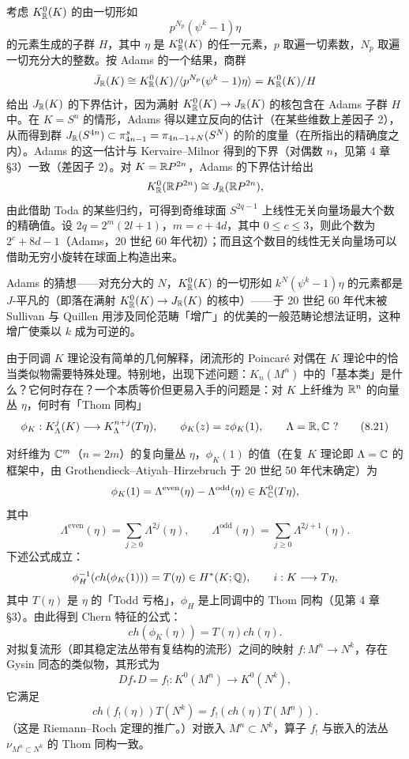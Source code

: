 考虑 $K_{\mathbb{R}}^0(K)$ 的由一切形如
\begin{equation}
p^{N_p}(\psi^k-1)\eta \tag{8.20}
\end{equation}
的元素生成的子群 $H$，其中 $\eta$ 是 $K_{\mathbb{R}}^0(K)$ 的任一元素，$p$ 取遍一切素数，$N_p$ 取遍一切充分大的整数。按 Adams 的一个结果，商群
\[
\bar J_{\mathbb{R}}(K)\cong K_{\mathbb{R}}^0(K)/\langle p^{N_p}(\psi^k-1)\eta\rangle=K_{\mathbb{R}}^0(K)/H
\]
给出 $J_{\mathbb{R}}(K)$ 的下界估计，因为满射 $K_{\mathbb{R}}^0(K)\to J_{\mathbb{R}}(K)$ 的核包含在 Adams 子群 $H$ 中。在 $K=S^n$ 的情形，Adams 得以建立反向的估计（在某些维数上差因子 2），从而得到群 $J_{\mathbb{R}}(S^{4n})\subset\pi^s_{4n-1}=\pi_{4n-1+N}(S^N)$ 的阶的度量（在所指出的精确度之内）。Adams 的这一估计与 Kervaire--Milnor 得到的下界（对偶数 $n$，见第 4 章 §3）一致（差因子 2）。对 $K=\mathbb{R}P^{2n}$，Adams 的下界估计给出
\[
K_{\mathbb{R}}^0(\mathbb{R}P^{2n})\cong J_{\mathbb{R}}(\mathbb{R}P^{2n}),
\]
由此借助 Toda 的某些归约，可得到奇维球面 $S^{2q-1}$ 上线性无关向量场最大个数的精确值。设 $2q=2^m(2l+1)$，$m=c+4d$，其中 $0\le c\le3$，则此个数为 $2^c+8d-1$（Adams，20 世纪 60 年代初）；而且这个数目的线性无关向量场可以借助无穷小旋转在球面上构造出来。

Adams 的猜想——对充分大的 $N$，$K_{\mathbb{R}}^0(K)$ 的一切形如 $k^N(\psi^k-1)\eta$ 的元素都是 $J$-平凡的（即落在满射 $K_{\mathbb{R}}^0(K)\to J_{\mathbb{R}}(K)$ 的核中）——于 20 世纪 60 年代末被 Sullivan 与 Quillen 用涉及同伦范畴「增广」的优美的一般范畴论想法证明，这种增广使乘以 $k$ 成为可逆的。

由于同调 $K$ 理论没有简单的几何解释，闭流形的 Poincaré 对偶在 $K$ 理论中的恰当类似物需要特殊处理。特别地，出现下述问题：$K_n(M^n)$ 中的「基本类」是什么？它何时存在？一个本质等价但更易入手的问题是：对 $K$ 上纤维为 $\mathbb{R}^n$ 的向量丛 $\eta$，何时有「Thom 同构」
\begin{equation}
\phi_K:K_\Lambda^j(K)\longrightarrow K_\Lambda^{n+j}(T\eta),\qquad \phi_K(z)=z\phi_K(1),\qquad \Lambda=\R,\C\ ? \tag{8.21}
\end{equation}

对纤维为 $\mathbb{C}^m$（$n=2m$）的复向量丛 $\eta$，$\phi_K(1)$ 的值（在复 $K$ 理论即 $\Lambda=\mathbb{C}$ 的框架中，由 Grothendieck--Atiyah--Hirzebruch 于 20 世纪 50 年代末确定）为
\[
\phi_K(1)=\Lambda^{\mathrm{even}}(\eta)-\Lambda^{\mathrm{odd}}(\eta)\in K_{\mathbb{C}}^0(T\eta),
\]
其中
\[
\Lambda^{\mathrm{even}}(\eta)=\sum_{j\ge0}\Lambda^{2j}(\eta),\qquad \Lambda^{\mathrm{odd}}(\eta)=\sum_{j\ge0}\Lambda^{2j+1}(\eta).
\]
下述公式成立：
\[
\phi_H^{-1}(ch(\phi_K(1)))=T(\eta)\in H^*(K;\mathbb{Q}),\qquad i:K\longrightarrow T\eta,
\]
其中 $T(\eta)$ 是 $\eta$ 的「Todd 亏格」，$\phi_H$ 是上同调中的 Thom 同构（见第 4 章 §3）。由此得到 Chern 特征的公式：
\[
ch(\phi_K(\eta))=T(\eta)ch(\eta).
\]
对拟复流形（即其稳定法丛带有复结构的流形）之间的映射 $f:M^n\to N^k$，存在 Gysin 同态的类似物，其形式为
\[
Df_*D=f_!:K^0(M^n)\longrightarrow K^0(N^k),
\]
它满足
\begin{equation}
ch(f_!(\eta))T(N^k)=f_!(ch(\eta)T(M^n)). \tag{8.22}
\end{equation}
（这是 Riemann--Roch 定理的推广。）对嵌入 $M^n\subset N^k$，算子 $f_!$ 与嵌入的法丛 $\nu_{M^n\subset N^k}$ 的 Thom 同构一致。


